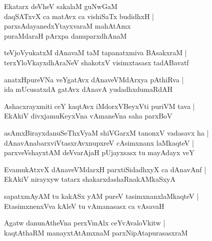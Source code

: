 \begin{shloka}
Ekatarx deVheV sakalaM guNwGaM\\
daqSATxvX ca matAvx ca vishiSaTx budidhxH |\\
parxsAdayanedxYtayxvaraM mahAtAmx\\
puraMdaraH pArxpa danuparxdhAnaM 
\end{shloka}

\begin{shloka}
teVjoVyukatxM dAnavaM taM tapanatxmiva BAsakxraM |\\
terxYloVkayxdhAraNeV shakotxV visimxtasasx tadABavatf
\end{shloka}

\begin{shloka}
anatxHpureVNa veYgatAvx dAnaveVMdArxya pAthiRva |\\
ida mUcusatxdA gatAvx dAnavA yudadhxdumaRdAH
\end{shloka}

\begin{shloka}
Ashacxrayxmiti ceY kaqtAvx iMdorxVBeyxVti puriVM tava |\\
EkAkiV divxjamuKeyxVna vAmaneVna saha parxBoV
\end{shloka}

\begin{shloka}
asAmxBirayxdanuSeThxVyaM shiVGarxM tanonxV vadasavx ha |\\
dAnavAnabarxviVtasxrAvxnupxreV cAsimxnanx laMkaqteV |\\
parxveVshayxtAM deVvarAjaH pUjayxsasx tu mayAdayx veY
\end{shloka}

\begin{shloka}
EvamukAtxvX dAnaveVMdarxH parxtiSidadhxyX ca dAnavAnf |\\
EkAkiV nirayxyw tatarx shakarxdashaRnakAMkaSxyA
\end{shloka}

\begin{shloka}
sapatxmAyAM tu kakASx yAM pureV tasimxnanxlaMkaqteV |\\
EtasimxnenxVva kAleV tu vAmanasasx ca vAsavaH 
\end{shloka}

\begin{shloka}
Agatw danunAtheVna perxVmAlx ceYvAvaloVkitw |\\
kaqtAthaRM manayxtAtAmxnaM parxNipAtapurasasxraM
\end{shloka}

